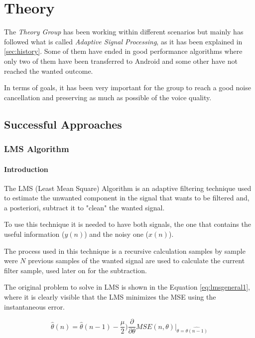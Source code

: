 \documentclass[11pt,a4paper,english]{book}  %
\theoremstyle{definition}  %
\theoremstyle{plain}  %
\theoremstyle{remark}  %
\begin{document}
\chapter{Theory}
\label{sec:theory}

The \textit{Theory Group} has been working within different scenarios but mainly has followed what is called \textit{Adaptive Signal Processing}, as it has been explained in \ref{sec:history}. Some of them have ended in good performance algorithms where only two of them have been transferred to Android and some other have not reached the wanted outcome.

In terms of goals, it has been very important for the group to reach a good noise cancellation and preserving as much as possible of the voice quality.

\section{Successful Approaches}

	\subsection{LMS Algorithm}
	\label{lms}
	
		\subsubsection{Introduction}
	
	The LMS (Least Mean Square) Algorithm \cite{asp} is an adaptive filtering technique used to estimate the unwanted component in the signal that wants to be filtered and, a posteriori, subtract it to "clean" the wanted signal.
	
	To use this technique it is needed to have both signals, the one that contains the useful information ($y(n)$) and the noisy one ($x(n)$).
	
	The process used in this technique is a recursive calculation samples by sample were $N$ previous samples of the wanted signal are used to calculate the current filter sample, used later on for the subtraction.
	
	The original problem to solve in LMS is shown in the Equation \ref{eq:lmsgeneral1}, where it is clearly visible that the LMS minimizes the MSE using the instantaneous error.
	
		\begin{equation}
	\label{eq:lmsgeneral1}
		\hat{\theta}(n) = \hat{\theta}(n-1) -\frac{\mu}{2})\frac{\partial}{\partial \theta}MSE(n,\theta)\rvert_{\theta=\hat{\theta(n-1)}}
	\end{equation}
	
\end{document}
